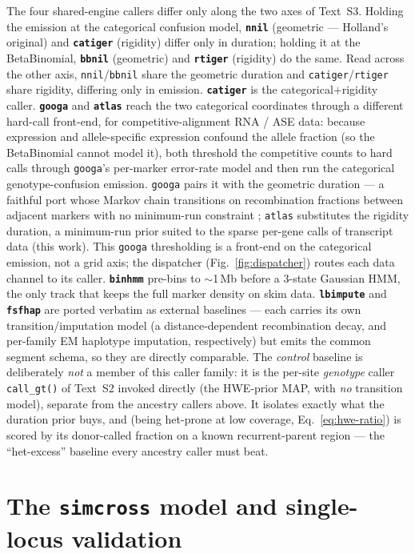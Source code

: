 \documentclass[11pt]{article}
\providecommand{\nnil}{\texttt{nnil}\xspace}
\providecommand{\bbnil}{\texttt{bbnil}\xspace}
\providecommand{\catiger}{\texttt{catiger}\xspace}
\providecommand{\rtiger}{\texttt{rtiger}\xspace}
\providecommand{\googa}{\texttt{googa}\xspace}
\providecommand{\atlas}{\texttt{atlas}\xspace}
\providecommand{\binhmm}{\texttt{binhmm}\xspace}
\providecommand{\lbimpute}{\texttt{lbimpute}\xspace}
\providecommand{\fsfhap}{\texttt{fsfhap}\xspace}
\begin{document}
The four shared-engine callers differ only along the two axes of Text~S3. Holding the emission
at the categorical confusion model, \textbf{\nnil} (geometric --- Holland's original) and
\textbf{\catiger} (rigidity) differ only in duration; holding it at the BetaBinomial, \textbf{\bbnil}
(geometric) and \textbf{\rtiger} (rigidity) do the same. Read across the other axis, \nnil/\bbnil share
the geometric duration and \catiger/\rtiger share rigidity, differing only in emission. \textbf{\catiger}
is the categorical$+$rigidity caller. \textbf{\googa} and \textbf{\atlas} reach the two categorical
coordinates through a different hard-call front-end, for competitive-alignment RNA / ASE data: because
expression and allele-specific expression confound the allele fraction (so the BetaBinomial cannot model
it), both threshold the competitive counts to hard calls through \googa's per-marker error-rate model
\citep{flagel2019} and then run the categorical genotype-confusion emission. \googa pairs it with the
geometric duration --- a faithful port whose Markov chain transitions on recombination fractions between
adjacent markers with no minimum-run constraint \citep{flagel2019,veltsos2024}; \atlas substitutes the
rigidity duration, a minimum-run prior suited to the sparse per-gene calls of transcript data (this work).
This \googa thresholding is a front-end on the categorical emission, not a grid axis; the dispatcher
(Fig.~\ref{fig:dispatcher}) routes each data channel to its caller. \textbf{\binhmm} pre-bins to $\sim$1\,Mb before a 3-state
Gaussian HMM, the only track that keeps the full marker density on skim data.
\textbf{\lbimpute} and \textbf{\fsfhap} are ported verbatim as external baselines ---
each carries its own transition/imputation model (a distance-dependent
recombination decay, and per-family EM haplotype imputation, respectively) but emits
the common segment schema, so they are directly comparable. The \emph{control} baseline
is deliberately \emph{not} a member of this caller family: it is the per-site
\emph{genotype} caller \texttt{call\_gt()} of Text~S2 invoked directly (the HWE-prior
MAP, with \emph{no} transition model), separate from the ancestry callers above. It
isolates exactly what the duration prior buys, and (being het-prone at low coverage,
Eq.~\eqref{eq:hwe-ratio}) is scored by its donor-called fraction on a known
recurrent-parent region --- the ``het-excess'' baseline every ancestry caller must beat.

\section{The \texttt{simcross} model and single-locus validation}
\label{sec:simcross}
\end{document}
